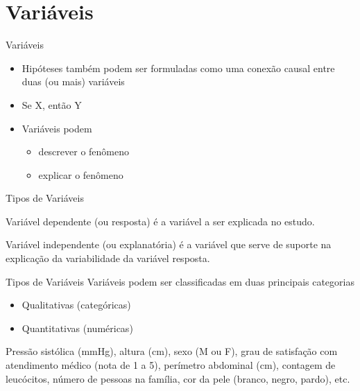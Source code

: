 \documentclass{beamer}
\begin{document}
\section{Variáveis}

\begin{frame}{Variáveis}
  \begin{itemize}
  \item Hipóteses também podem ser formuladas como uma conexão causal
    entre duas (ou mais) variáveis
  \item Se X, então Y
  \item Variáveis podem
    \begin{itemize}
    \item descrever o fenômeno
    \item explicar o fenômeno
    \end{itemize}
  \end{itemize}
\end{frame}

\begin{frame}{Tipos de Variáveis}
  \begin{definition}
    Variável \alert{dependente} (ou resposta) é a variável a ser
    explicada no estudo.
  \end{definition}
  \begin{definition}
    Variável \alert{independente} (ou explanatória) é a variável que
    serve de suporte na explicação da variabilidade da variável
    resposta.
  \end{definition}
\end{frame}

\begin{frame}{Tipos de Variáveis}
Variáveis podem ser classificadas em duas principais categorias
  \begin{itemize}
  \item Qualitativas (categóricas)
  \item Quantitativas (numéricas)
  \end{itemize}
  \begin{example}
    Pressão sistólica (mmHg), altura (cm), sexo (M ou F), grau de
    satisfação com atendimento médico (nota de 1 a 5), perímetro
    abdominal (cm), contagem de leucócitos, número de pessoas na
    família, cor da pele (branco, negro, pardo), etc.
  \end{example}
\end{frame}
\end{document}
